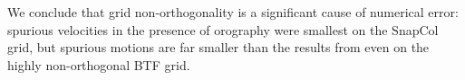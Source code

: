 We conclude that grid non-orthogonality is a significant cause of numerical error: spurious velocities in the presence of orography were smallest on the SnapCol grid, but spurious motions are far smaller than the results from \textcite{klemp2011} even on the highly non-orthogonal BTF grid.

